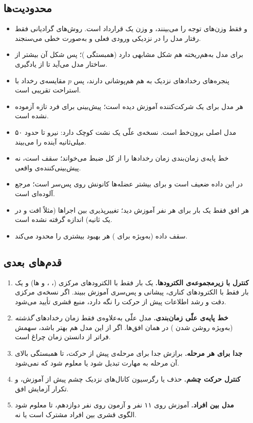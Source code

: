 \subsection{محدودیت‌ها}
\begin{itemize}
\item {} و  فقط وزن‌های توجه را می‌بینند، و وزن   یک قرارداد است. روش‌های گرادیانی فقط رفتار مدل را در نزدیکی ورودی فعلی و به‌صورت خطی می‌سنجند.
\item {}  برای مدل به‌هم‌ریخته هم شکل مشابهی دارد (همبستگی )؛ پس شکل آن بیشتر از ساختار مدل می‌آید تا از یادگیری.
\item پنجره‌های رخدادهای نزدیک به هم هم‌پوشانی دارند، پس $p$ مقایسه‌ی رخداد با استراحت تقریبی است.
\item هر مدل برای یک شرکت‌کننده آموزش دیده است؛ پیش‌بینی برای فرد تازه آزموده نشده است.
\item مدل اصلی برون‌خط است. نسخه‌ی علّی یک نشت کوچک دارد:  نیرو تا حدود ۵۰ میلی‌ثانیه آینده را می‌بیند.
\item خط پایه‌ی زمان‌بندی زمان رخدادها را از کل ضبط می‌خواند؛ سقف است، نه پیش‌بینی‌کننده‌ی واقعی.
\item {} در این داده ضعیف است و برای بیشتر عضله‌ها کانونش روی پس‌سر است؛ مرجع آلوده‌ای است.
\item هر افق فقط یک بار برای هر نفر آموزش دید؛ تغییرپذیری بین اجراها (مثلاً افت  و  در یک ثانیه) اندازه گرفته نشده است.
\item سقف داده (به‌ویژه برای ) هر بهبود بیشتری را محدود می‌کند.
\end{itemize}

\subsection{قدم‌های بعدی}
\begin{enumerate}
\item \textbf{کنترل  با زیرمجموعه‌ی الکترودها.}  یک بار فقط با الکترودهای مرکزی (، ،  و ها) و یک بار فقط با الکترودهای کناری، پیشانی و پس‌سری آموزش ببیند. اگر نسخه‌ی مرکزی دقت  و رشد اطلاعات پیش از حرکت را نگه دارد، منبع قشری تأیید می‌شود.
\item \textbf{خط پایه‌ی علّی زمان‌بندی.} مدل علّی  به‌علاوه‌ی فقط زمان رخدادهای \emph{گذشته} (به‌ویژه روشن شدن ) در همان افق‌ها. اگر  از این مدل هم بهتر باشد، سهمش فراتر از دانستن زمان چراغ است.
\item \textbf{ جدا برای هر مرحله.} برازش جدا برای مرحله‌ی پیش از حرکت، تا همبستگی بالای آن مرحله به مهارت تبدیل شود یا معلوم شود که نمی‌شود.
\item \textbf{کنترل حرکت چشم.} حذف یا رگرسیون کانال‌های نزدیک چشم پیش از آموزش، و تکرار آزمایش افق.
\item \textbf{مدل بین افراد.} آموزش روی ۱۱ نفر و آزمون روی نفر دوازدهم، تا معلوم شود الگوی قشری بین افراد مشترک است یا نه.
\end{enumerate}

